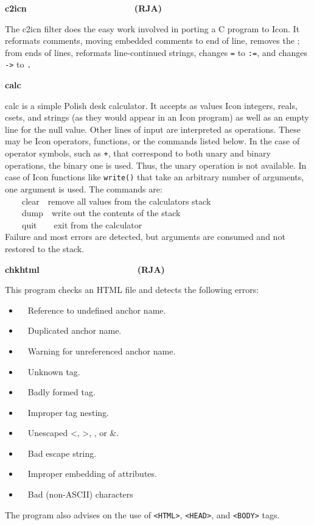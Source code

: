 {{\sffamily\bfseries
c2icn\ \ \ \ \ \ \ \ \ \ \ \ \ \ \ \ \ \ \ \ \ \ (RJA)}

The \textsf{c2icn} filter does the easy work involved in porting a C
program to Icon. It reformats comments, moving embedded
comments to end of line, removes the {\textquotedbl};{\textquotedbl}
from ends of lines, reformats line-continued strings, changes
\texttt{=} to \texttt{:=}, and changes \texttt{{}-{\textgreater}} to
\texttt{.} 

{\sffamily\bfseries
calc\ \ \ \ \ \ \ \ \ \ \ \ \ \ \ \ \ \ \ \ \ \ }

\textsf{calc} is a simple Polish {\textquotedbl}desk
calculator{\textquotedbl}. It accepts as values Icon integers, reals,
csets, and strings (as they would appear in an Icon program) as well as
an empty line for the null value. Other lines of input are interpreted
as operations. These may be Icon operators, functions, or the commands
listed below. In the case of operator symbols, such as \texttt{+}, that
correspond to both unary and binary operations, the binary one is used.
Thus, the unary operation is not available. In case of Icon functions
like \texttt{write()} that take an arbitrary number of arguments, one
argument is used. The commands are:\\
 \ \ \ \ clear\ \ remove all values from the
calculator{\textquotesingle}s stack\\
 \ \ \ \ dump\ \ write out the contents of the stack\\
 \ \ \ \ quit\ \ \ \ exit from the calculator\\
Failure and most errors are detected, but arguments are consumed and not
restored to the stack.

{\sffamily\bfseries
chkhtml\ \ \ \ \ \ \ \ \ \ \ \ \ \ \ \ \ \ \ \ (RJA)}

This program checks an HTML file and detects the following
errors:

\begin{itemize}
\item \ \ Reference to undefined anchor name.
\item \ \ Duplicated anchor name.
\item \ \ Warning for unreferenced anchor name.
\item \ \ Unknown tag.
\item \ \ Badly formed tag.
\item \ \ Improper tag nesting.
\item \ \ Unescaped {\textless}, {\textgreater}, {\textquotedbl}, or \&.
\item \ \ Bad escape string.
\item \ \ Improper embedding of attributes.
\item \ \ Bad (non-ASCII) characters
\end{itemize}
The program also advises on the use of
\texttt{{\textless}HTML{\textgreater}},
\texttt{{\textless}HEAD{\textgreater}}, and
\texttt{{\textless}BODY{\textgreater}} tags. 

}
